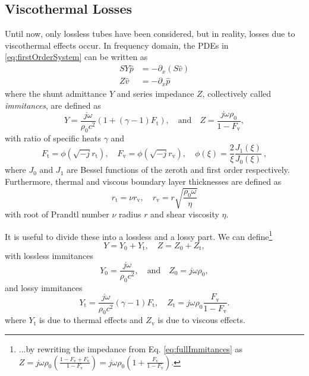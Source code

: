 \documentclass[dvipsnames]{article}
\begin{document}
\subsection{Viscothermal Losses}
Until now, only lossless tubes have been considered, but in reality, losses due to viscothermal effects occur. In frequency domain, the PDEs in \eqref{eq:firstOrderSystem} can be written as  
\begin{subequations}\label{eq:firstOrderSystemFreq}
    \begin{align}
        SY\hat p &= -\partial_x(S\hat v)\\
        Z\hat v &= -\partial_x \hat p
    \end{align}    
\end{subequations}
where the shunt admittance $Y$ and series impedance $Z$, collectively called \textit{immitances}, are defined as
\begin{equation}\label{eq:fullImmitances}
    Y = \frac{j\omega}{\rho_0 c^2}(1+(\gamma-1)F_\text{t}),\quad \text{and} \quad Z = \frac{ j\omega\rho_0 }{1-F_\text{v}},
\end{equation}
with ratio of specific heats $\gamma$ and
\begin{equation}
    F_\text{t} = \phi \left(\sqrt{-j}r_\text{t}\right), \quad F_\text{v} = \phi\left(\sqrt{-j}r_\text{v}\right), \quad \phi(\xi) = \frac{2}{\xi}\frac{J_1(\xi)}{J_0(\xi)}\ ,
\end{equation}
where $J_0$ and $J_1$ are Bessel functions of the zeroth and first order respectively.
Furthermore, thermal and viscous boundary layer thicknesses are defined as
\begin{equation}
    r_\text{t} = \nu r_\text{v}, \quad r_\text{v} = r\sqrt{\frac{\rho_0 \omega}{\eta}}
\end{equation}
with root of Prandtl number $\nu$ radius $r$ and shear viscosity $\eta$.

It is useful to divide these into a lossless and a lossy part. We can define\footnote{...by rewriting the impedance from Eq. \eqref{eq:fullImmitances} as $
     Z = j\omega\rho_0 \left(\frac{1 - F_\text{v} + F_\text{v}}{1-F_\text{v}}\right) = j \omega\rho_0  \left(1 + \frac{F_\text{v}}{1-F_\text{v}}\right)
$.}
\begin{equation}\label{eq:lossyLosslessImmitances}
    Y = Y_0 + Y_\text{t}, \quad Z = Z_0 + Z_\text{t},
\end{equation}
with lossless immitances
\begin{equation}
   Y_0 = \frac{j\omega}{\rho_0 c^2}, \quad \text{and} \quad Z_0 = j\omega\rho_0,
\end{equation}
and lossy immitances
\begin{equation}
Y_\text{t} = \frac{j\omega}{\rho_0 c^2} (\gamma - 1)F_\text{t},\quad Z_\text{t} = j \omega\rho_0  \frac{F_\text{v}}{1-F_\text{v}}.
\end{equation}
where $Y_\text{t}$ is due to thermal effects and $Z_\text{v}$ is due to viscous effects. 
\end{document}
